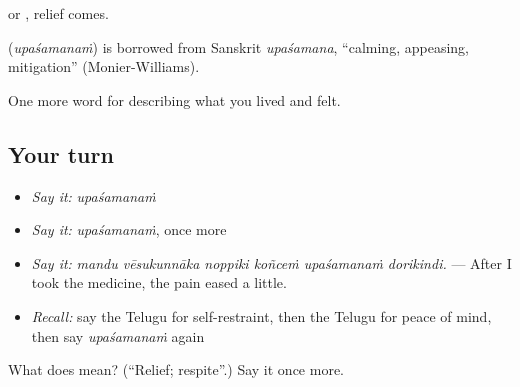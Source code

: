   or , relief comes.

\begin{cousinweb}
\textbf{} (\emph{upaśamanaṁ}) is borrowed from Sanskrit \emph{upaśamana}, \textquotedblleft{}calming, appeasing, mitigation\textquotedblright{} (Monier-Williams).
\end{cousinweb}

\begin{grammarlens}[title={What you've built}]
One more word for describing what you lived and felt.
\end{grammarlens}

\subsection*{Your turn}
\begin{itemize}
\raggedright
  \item \emph{Say it:} \emph{upaśamanaṁ}
  \item \emph{Say it:} \emph{upaśamanaṁ}, once more
  \item \emph{Say it:} \emph{mandu vēsukunnāka noppiki koñceṁ upaśamanaṁ dorikindi.} — After I took the medicine, the pain eased a little.
  \item \emph{Recall:} say the Telugu for self-restraint, then the Telugu for peace of mind, then say \emph{upaśamanaṁ} again
\end{itemize}

\begin{tcolorbox}[breakable,colback=teal!4,colframe=teal!35!black,title={Before you move on}]
What does  mean? (\textquotedblleft{}Relief; respite\textquotedblright{}.) Say it once more.
\end{tcolorbox}
